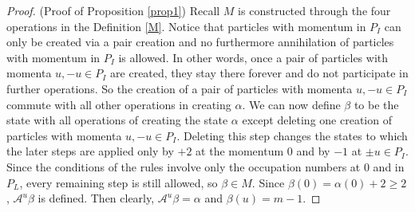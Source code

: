 \documentclass[11pt]{article}
\numberwithin{equation}{section}
\newcommand\al{{\alpha}}
\newcommand\be{\beta}
\theoremstyle{definition}
\begin{document}
\begin{proof}  (Proof of Proposition \ref{prop1}) Recall $M$ is constructed through the four operations in the Definition \ref{M}. Notice that
particles with momentum in $P_I$ can only be created via a pair creation and no furthermore annihilation
of particles with momentum in $P_I$ is allowed. In other words, once a pair of particles with momenta
$u, -u \in P_I$ are created, they stay there forever and do not participate in further operations.  So the creation
of a pair of particles with momenta
$u, -u \in P_I$ commute with all other operations in creating $\alpha$. We can now define $\beta$ to be the state
with all operations of creating the state  $\alpha$ except deleting one creation of particles with momenta
$u, -u \in P_I$.
Deleting this step changes the states to which the later steps are applied only by $+2$ at the momentum $0$ and by $-1$ at $\pm u\in P_I$.
Since the conditions of the rules involve only the occupation numbers at $0$ and in $P_L$, every remaining step is still allowed, so $\be\in M$.
Since $\be(0)=\al(0)+2\geq2$, $\mathcal A^u\be$ is defined.
Then clearly,  $\mathcal A^{u}\beta=\al$ and $\be(u)=m-1$.

\end{proof}
\end{document}

